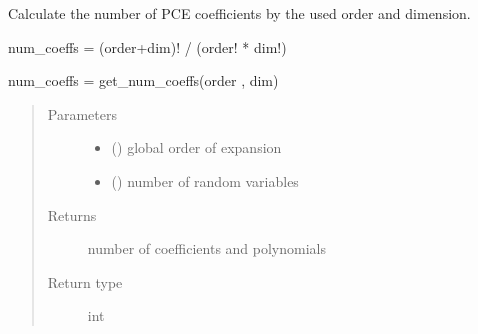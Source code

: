 \documentclass[letterpaper,10pt,english,openany,oneside]{sphinxmanual}
\begin{document}
\begin{fulllineitems}
\label{\detokenize{pygpc:pygpc.misc.get_num_coeffs}}
Calculate the number of PCE coefficients by the used order and dimension.

num\_coeffs = (order+dim)! / (order! * dim!)

num\_coeffs = get\_num\_coeffs(order , dim)
\begin{quote}\begin{description}
\item[{Parameters}] \leavevmode\begin{itemize}
\item {} 
 () \textendash{} global order of expansion

\item {} 
 () \textendash{} number of random variables

\end{itemize}

\item[{Returns}] \leavevmode
{} \textendash{} number of coefficients and polynomials

\item[{Return type}] \leavevmode
int

\end{description}\end{quote}

\end{fulllineitems}

\end{document}
